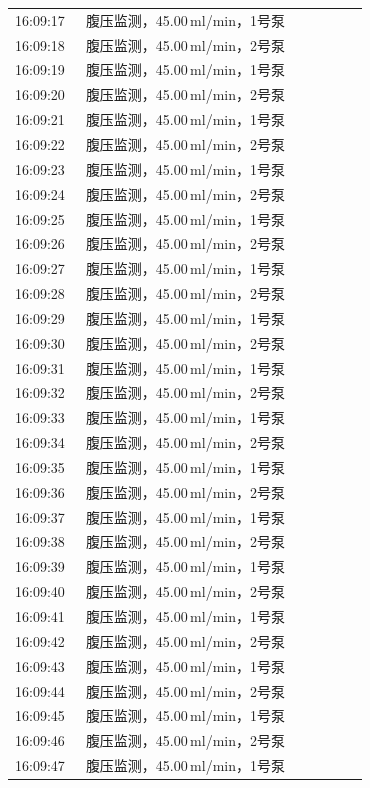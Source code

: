 \documentclass[UTF8,10pt,a4paper,fontset=fandol]{ctexart}
\begin{document}
\begin{center}
\begin{tabular}{p{0.18\linewidth}p{0.72\linewidth}}
16:09:17 & 腹压监测，45.00\,ml/min，1号泵\\
16:09:18 & 腹压监测，45.00\,ml/min，2号泵\\
16:09:19 & 腹压监测，45.00\,ml/min，1号泵\\
16:09:20 & 腹压监测，45.00\,ml/min，2号泵\\
16:09:21 & 腹压监测，45.00\,ml/min，1号泵\\
16:09:22 & 腹压监测，45.00\,ml/min，2号泵\\
16:09:23 & 腹压监测，45.00\,ml/min，1号泵\\
16:09:24 & 腹压监测，45.00\,ml/min，2号泵\\
16:09:25 & 腹压监测，45.00\,ml/min，1号泵\\
16:09:26 & 腹压监测，45.00\,ml/min，2号泵\\
16:09:27 & 腹压监测，45.00\,ml/min，1号泵\\
16:09:28 & 腹压监测，45.00\,ml/min，2号泵\\
16:09:29 & 腹压监测，45.00\,ml/min，1号泵\\
16:09:30 & 腹压监测，45.00\,ml/min，2号泵\\
16:09:31 & 腹压监测，45.00\,ml/min，1号泵\\
16:09:32 & 腹压监测，45.00\,ml/min，2号泵\\
16:09:33 & 腹压监测，45.00\,ml/min，1号泵\\
16:09:34 & 腹压监测，45.00\,ml/min，2号泵\\
16:09:35 & 腹压监测，45.00\,ml/min，1号泵\\
16:09:36 & 腹压监测，45.00\,ml/min，2号泵\\
16:09:37 & 腹压监测，45.00\,ml/min，1号泵\\
16:09:38 & 腹压监测，45.00\,ml/min，2号泵\\
16:09:39 & 腹压监测，45.00\,ml/min，1号泵\\
16:09:40 & 腹压监测，45.00\,ml/min，2号泵\\
16:09:41 & 腹压监测，45.00\,ml/min，1号泵\\
16:09:42 & 腹压监测，45.00\,ml/min，2号泵\\
16:09:43 & 腹压监测，45.00\,ml/min，1号泵\\
16:09:44 & 腹压监测，45.00\,ml/min，2号泵\\
16:09:45 & 腹压监测，45.00\,ml/min，1号泵\\
16:09:46 & 腹压监测，45.00\,ml/min，2号泵\\
16:09:47 & 腹压监测，45.00\,ml/min，1号泵\\

\end{tabular}
\end{center}
\end{document}
